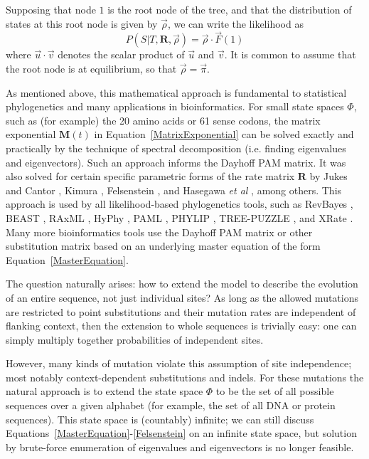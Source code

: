 \documentclass{bmcart}
\newcommand{\matr}[1]{\mathbf{#1}}
\newcommand{\eqref}[1]{Equation~\ref{#1}}
\newcommand{\statespace}{\Phi}
\newcommand{\ratematrix}{\matr{R}}
\newcommand{\eqmvec}{\vec{\pi}}
\newcommand{\condmatrix}{\matr{M}}
\newcommand{\felsvec}{\vec{F}}
\newcommand{\scalarprod}{\cdot}
\newcommand{\initvec}{\vec{\rho}}
\begin{document}
Supposing that node $1$ is the root node of the tree,
and that the distribution of states at this root node is given by $\initvec$,
we can write the likelihood as
\begin{equation}
P(S|T,\ratematrix,\initvec) = \initvec \scalarprod \felsvec(1)
\label{Likelihood}
\end{equation}
where $\vec{u} \scalarprod \vec{v}$ denotes the scalar product of $\vec{u}$ and $\vec{v}$.
It is common to assume that the root node is at equilibrium,
so that $\initvec = \eqmvec$.

As mentioned above, this mathematical approach is fundamental to statistical phylogenetics
and many applications in bioinformatics.
For small state spaces $\statespace$, such as (for example) the 20 amino acids or 61 sense codons,
the matrix exponential $\condmatrix(t)$ in \eqref{MatrixExponential} can be solved exactly and practically
by the technique of spectral decomposition (i.e. finding eigenvalues and eigenvectors).
Such an approach informs the Dayhoff PAM matrix.
It was also solved for certain specific parametric forms of the rate matrix $\ratematrix$
by Jukes and Cantor \cite{JukesCantor69}, Kimura \cite{Kimura80}, Felsenstein \cite{Felsenstein81},
and Hasegawa {\em et al} \cite{HasegawaEtal85}, among others.
This approach is used by all likelihood-based phylogenetics tools, such as
RevBayes \cite{HohnaEtAl2016},
BEAST \cite{pmid17996036},
RAxML \cite{pmid16928733},
HyPhy \cite{pmid15509596},
PAML \cite{pmid17483113},
PHYLIP \cite{Felsenstein1989},
TREE-PUZZLE \cite{pmid11934758},
and XRate \cite{pmid22693624}.
Many more bioinformatics tools use the Dayhoff PAM matrix or other substitution matrix
based on an underlying master equation of the form \eqref{MasterEquation}.

The question naturally arises: how to extend the model to describe the evolution of an entire sequence,
not just individual sites?
As long as the allowed mutations are restricted to point substitutions
and their mutation rates are independent of flanking context,
then the extension to whole sequences is trivially easy:
one can simply multiply together probabilities of independent sites.

However, many kinds of mutation violate this assumption of site independence;
most notably context-dependent substitutions and indels.
For these mutations the natural approach is to extend the state space $\statespace$
to be the set of all possible sequences over a given alphabet
(for example, the set of all DNA or protein sequences).
This state space is (countably) infinite;
we can still discuss Equations~\ref{MasterEquation}-\ref{Felsenstein}
on an infinite state space,
but solution by brute-force enumeration of eigenvalues and eigenvectors is no longer feasible.
\end{document}
